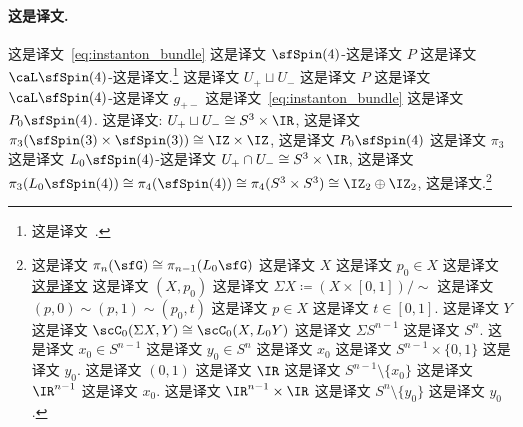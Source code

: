 \documentclass[
    affil-it, %
    auth-lg, %
    british, %
    compression, %
    contents, %
    custom-packages={}, %
    references={bigone}, %
]{lib/preprint}
\begin{document}
\begin{body}
        \paragraph{这是译文.} 这是译文~\eqref{eq:instanton_bundle} 这是译文 $\sfSpin(4)$-这是译文 $P$ 这是译文 $\caL\sfSpin(4)$-这是译文.\footnote{这是译文~\cite{Popov:2015wsa}.}
 这是译文 $U_+\sqcup U_-$ 这是译文 $P$ 这是译文 $\caL\sfSpin(4)$-这是译文 $g_{+-}$ 这是译文~\eqref{eq:instanton_bundle} 这是译文 $P_0\sfSpin(4)$. 这是译文: $U_+\sqcup U_-\cong S^3\times \IR$, 这是译文 $\pi_3(\sfSpin(3)\times \sfSpin(3))\cong \IZ\times \IZ$, 这是译文 $P_0\sfSpin(4)$ 这是译文 $\pi_3$ 这是译文 $L_0\sfSpin(4)$-这是译文 $U_+\cap U_-\cong S^3\times\IR$, 这是译文 $\pi_3(L_0\sfSpin(4))\cong\pi_4(\sfSpin(4))\cong\pi_4(S^3\times S^3)\cong\IZ_2\oplus\IZ_2$, 这是译文.\footnote{这是译文 $\pi_{n}(\sfG)\cong\pi_{n-1}(L_0\sfG)$ 这是译文 $X$ 这是译文 $p_0\in X$ 这是译文 \uline{这是译文} 这是译文 $(X,p_0)$ 这是译文 $\Sigma X\coloneqq(X\times[0,1])/\!\!\sim$ 这是译文 $(p,0)\sim(p,1)\sim(p_0,t)$ 这是译文 $p\in X$ 这是译文 $t\in[0,1]$. 这是译文 $Y$ 这是译文 $\scC_0(\Sigma X,Y)\cong\scC_0(X,L_0Y)$ 这是译文 $\Sigma S^{n-1}$ 这是译文 $S^n$. 这是译文 $x_0\in S^{n-1}$ 这是译文 $y_0\in S^n$ 这是译文 $x_0$ 这是译文 $S^{n-1}\times\{0,1\}$ 这是译文 $y_0$. 这是译文 $(0,1)$ 这是译文 $\IR$ 这是译文 $S^{n-1}\setminus\{x_0\}$ 这是译文 $\IR^{n-1}$ 这是译文 $x_0$. 这是译文 $\IR^{n-1}\times\IR$ 这是译文 $S^n\setminus\{y_0\}$ 这是译文 $y_0$.\label{fn:reduced_suspension}}
                

\end{body}
\end{document}
